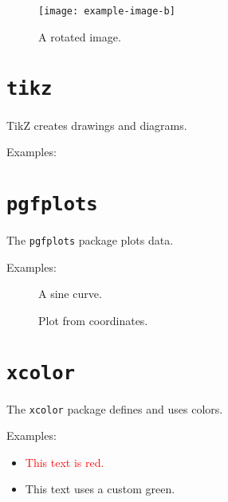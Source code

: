 \documentclass[12pt]{article}
\begin{document}
\begin{figure}[h]
  \centering
  \texttt{[image: example-image-b]}
  \caption{A rotated image.}
\end{figure}

\section{\texttt{tikz}}\label{sec:tikz}
TikZ creates drawings and diagrams.

Examples:


\section{\texttt{pgfplots}}\label{sec:pgfplots}
The \texttt{pgfplots} package plots data.

Examples:
\begin{figure}[h]
  \centering
  \caption{A sine curve.}
  \label{fig:plot}
\end{figure}

\begin{figure}[h]
  \centering
  \caption{Plot from coordinates.}
\end{figure}

\section{\texttt{xcolor}}\label{sec:xcolor}
The \texttt{xcolor} package defines and uses colors.

Examples:
\begin{itemize}
  \item \textcolor{red}{This text is red.}
  \item {}\textcolor{mygreen}{This text uses a custom green.}
\end{itemize}
\end{document}
